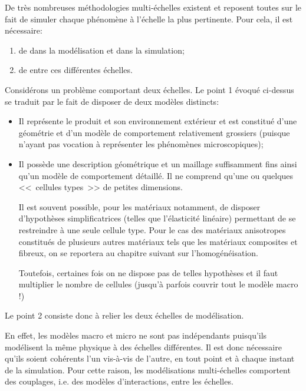 \medskip
De très nombreuses méthodologies multi-échelles existent et reposent
toutes sur le fait de simuler chaque phénomène à l'échelle la plus
pertinente.
Pour cela, il est nécessaire:
\begin{enumerate}
  \item de  dans la modélisation et dans la simulation;
  \item de  entre ces différentes échelles.
\end{enumerate}

\medskip
Considérons un problème comportant deux échelles.
Le point 1 évoqué ci-dessus se traduit par le fait de disposer de deux modèles
distincts:
\begin{itemize}
  \item {}

	Il représente le produit et son environnement extérieur et est constitué
	d'une géométrie et d'un modèle de comportement relativement grossiers
	(puisque n'ayant pas vocation à représenter les phénomènes microscopiques);
  \item {}

	Il possède une description géométrique et un maillage suffisamment fins ainsi qu'un
	modèle de comportement détaillé. Il ne comprend qu'une ou quelques
	<<~cellules types~>> de petites dimensions.

	Il est souvent possible, pour les matériaux notamment, de disposer d'hypothèses
	simplificatrices (telles que l'élasticité linéaire) permettant de se restreindre à une
	seule cellule type.
	Pour le cas des matériaux anisotropes constitués de plusieurs autres matériaux tels
	que les matériaux composites et fibreux, on se reportera au chapitre suivant sur l'homogénéisation.

	Toutefois, certaines fois on ne dispose pas de telles hypothèses et il faut multiplier le nombre
	de cellules (jusqu'à parfois couvrir tout le modèle macro !)
\end{itemize}

\medskip
Le point 2 consiste donc à relier les deux échelles de modélisation.

En effet, les modèles macro et micro ne sont pas indépendants puisqu'ils
modélisent la même physique à des échelles différentes.
Il est donc nécessaire qu'ils soient cohérents l'un vis-à-vis de l'autre, en tout point et à
chaque instant de la simulation.
Pour cette raison, les modélisations multi-échelles comportent des couplages, i.e. des
modèles d'interactions, entre les échelles.

